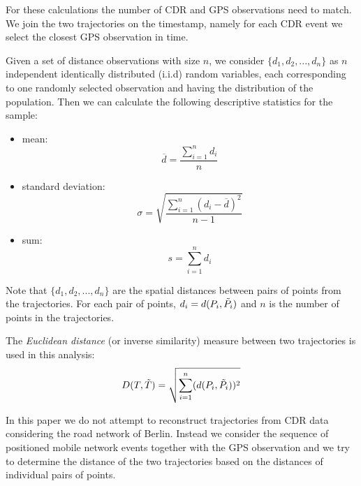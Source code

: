 For these calculations the number of CDR and GPS observations need to match. We join the two trajectories on the timestamp, namely for each CDR event we select the closest GPS observation in time.

Given a set of distance observations with size $n$, we consider $\{d_{1}, d_{2}, ..., d_{n}\}$ as $n$ independent identically distributed (i.i.d) random variables, each corresponding to one randomly selected observation and having the distribution of the population. Then we can calculate the following descriptive statistics for the sample:
\begin{itemize}
    \item mean:
     \[ \overline {d} = \frac{\sum_{i=1}^{n} d_{i}}{n}\]
     \item standard deviation:
    \[ \sigma={\sqrt {\frac {\sum _{i=1}^{n}(d_{i}-{\overline {d}})^{2}}{n-1}}}\]
    \item sum:        
    \[s = \sum_{i=1}^{n} d_{i}\]
\end{itemize}

Note that $\{d_{1}, d_{2}, ..., d_{n}\}$ are the spatial distances between pairs of points from the trajectories. For each pair of points, $d_{i} = d(P_{i},\Tilde{P_{i}})$ and $n$ is the number of points in the trajectories.

The \textit{Euclidean distance} (or inverse similarity) measure between two trajectories is used in this analysis:
\[D(T,\Tilde{T}) = \sqrt{\sum_{i=1}^{n} (d(P_{i},\Tilde{P_{i}}))^{2}}\]

In this paper we do not attempt to reconstruct trajectories from CDR data considering the road network of Berlin. Instead we consider the sequence of positioned mobile network events together with the GPS observation and we try to determine the distance of the two trajectories based on the distances of individual pairs of points.




